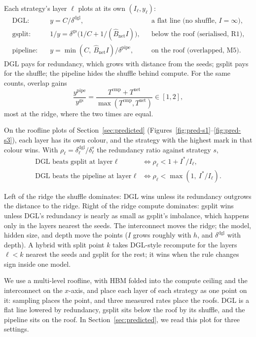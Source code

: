 Each strategy's layer $\ell$ plots at its own $(I_\ell, y_\ell)$:
\begin{align}
  \text{DGL:}\quad & y = C/\delta^{\mathrm{dgl}},
    && \text{a flat line (no shuffle, } I = \infty), \label{eq:cm-dp-point}\\
  \text{gsplit:}\quad & 1/y = \delta^{\mathrm{gs}}\big(1/C + 1/(\hat{B}_{\mathrm{net}} I)\big),
    && \text{below the roof (serialised, R1)}, \label{eq:cm-gsplit-point}\\
  \text{pipeline:}\quad & y = \min(C,\ \hat{B}_{\mathrm{net}} I)/\delta^{\mathrm{pipe}},
    && \text{on the roof (overlapped, M5)}. \label{eq:cm-pipe-point}
\end{align}
DGL pays for redundancy, which grows with distance from the seeds; gsplit pays for the shuffle;
the pipeline hides the shuffle behind compute. For the same counts, overlap gains
\begin{equation}
  \frac{y^{\mathrm{pipe}}}{y^{\mathrm{gs}}}
  = \frac{T^{\mathrm{cmp}} + T^{\mathrm{net}}}{\max(T^{\mathrm{cmp}}, T^{\mathrm{net}})}
  \in [1, 2],
  \label{eq:cm-pipe-gain}
\end{equation}
most at the ridge, where the two times are equal.

On the roofline plots of Section~\ref{sec:predicted}
(Figures~\ref{fig:pred-s1}--\ref{fig:pred-s3}), each layer has its own colour, and the strategy
with the highest mark in that colour wins. With $\rho_\ell = \delta^{\mathrm{dgl}}_\ell /
\delta^{s}_\ell$ the redundancy ratio against strategy $s$,
\begin{equation}
  \boxed{\;
  \begin{aligned}
    \text{DGL beats gsplit at layer } \ell
      &\iff \rho_\ell < 1 + I^{*}/I_\ell,\\
    \text{DGL beats the pipeline at layer } \ell
      &\iff \rho_\ell < \max(1,\ I^{*}/I_\ell).
  \end{aligned}\;}
  \label{eq:cm-rule}
\end{equation}

\label{sec:cm-regions}
Left of the ridge the shuffle dominates: DGL wins unless its redundancy outgrows the distance to
the ridge. Right of the ridge compute dominates: gsplit wins unless DGL's redundancy is nearly as
small as gsplit's imbalance, which happens only in the layers nearest the seeds. The interconnect
moves the ridge; the model, hidden size, and depth move the points ($I$ grows roughly with $h$,
and $\delta^{\mathrm{dgl}}$ with depth). A hybrid with split point $k$ takes DGL-style recompute
for the layers $\ell < k$ nearest the seeds and gsplit for the rest; it wins when the rule changes
sign inside one model.

We use a multi-level roofline, with HBM folded into the compute ceiling and the interconnect on
the $x$-axis, and place each layer of each strategy as one point on it: sampling places the point,
and three measured rates place the roofs. DGL is a flat line lowered by redundancy, gsplit sits below the roof by its
shuffle, and the pipeline sits on the roof. In Section~\ref{sec:predicted}, we read this plot for
three settings.
